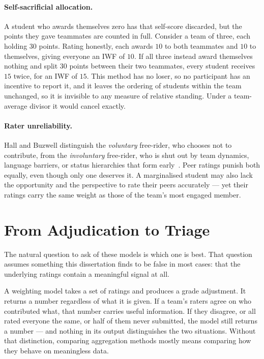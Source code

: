 \paragraph{Self-sacrificial allocation.} A student who awards themselves zero has
that self-score discarded, but the points they gave teammates are counted in
full. Consider a team of three, each holding $30$ points. Rating honestly, each
awards $10$ to both teammates and $10$ to themselves, giving everyone an IWF of
$10$. If all three instead award themselves nothing and split $30$ points
between their two teammates, every student receives $15$ twice, for an IWF of
$15$. This method has no loser,
so no participant has an incentive to report it, and it leaves the ordering of
students within the team unchanged, so it is invisible to any measure of
relative standing. Under a team-average divisor it would cancel exactly.

\paragraph{Rater unreliability.} Hall and Buzwell distinguish the \emph{voluntary} free-rider, who chooses not to contribute, from the \emph{involuntary} free-rider, who is shut out by team dynamics, language barriers, or status hierarchies that form early~\citep{hall2013freeriding}. Peer ratings punish both equally, even though only one deserves it. A marginalised student may also lack the opportunity and the perspective to rate their peers accurately — yet their ratings carry the same weight as those of the team's most engaged member.

\section{From Adjudication to Triage}
\label{sec:triage}

The natural question to ask of these models is which one is best. That question assumes something this dissertation finds to be false in most cases: that the underlying ratings contain a meaningful signal at all.

A weighting model takes a set of ratings and produces a grade adjustment. It returns a number regardless of what it is given. If a team's raters agree on who contributed what, that number carries useful information. If they disagree, or all rated everyone the same, or half of them never submitted, the model still returns a number — and nothing in its output distinguishes the two situations. Without that distinction, comparing aggregation methods mostly means comparing how they behave on meaningless data.

